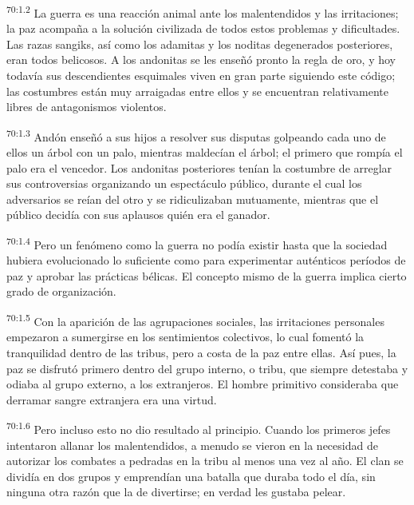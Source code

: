 \documentclass[twoside, 11pt]{book}
\begin{document}
\par
\textsuperscript{70:1.2} La guerra es una reacción animal ante los malentendidos y las irritaciones; la paz acompaña a la solución civilizada de todos estos problemas y dificultades. Las razas sangiks, así como los adamitas y los noditas degenerados posteriores, eran todos belicosos. A los andonitas se les enseñó pronto la regla de oro, y hoy todavía sus descendientes esquimales viven en gran parte siguiendo este código; las costumbres están muy arraigadas entre ellos y se encuentran relativamente libres de antagonismos violentos.

\par
\textsuperscript{70:1.3} Andón enseñó a sus hijos a resolver sus disputas golpeando cada uno de ellos un árbol con un palo, mientras maldecían el árbol; el primero que rompía el palo era el vencedor. Los andonitas posteriores tenían la costumbre de arreglar sus controversias organizando un espectáculo público, durante el cual los adversarios se reían del otro y se ridiculizaban mutuamente, mientras que el público decidía con sus aplausos quién era el ganador.

\par
\textsuperscript{70:1.4} Pero un fenómeno como la guerra no podía existir hasta que la sociedad hubiera evolucionado lo suficiente como para experimentar auténticos períodos de paz y aprobar las prácticas bélicas. El concepto mismo de la guerra implica cierto grado de organización.

\par
\textsuperscript{70:1.5} Con la aparición de las agrupaciones sociales, las irritaciones personales empezaron a sumergirse en los sentimientos colectivos, lo cual fomentó la tranquilidad dentro de las tribus, pero a costa de la paz entre ellas. Así pues, la paz se disfrutó primero dentro del grupo interno, o tribu, que siempre detestaba y odiaba al grupo externo, a los extranjeros. El hombre primitivo consideraba que derramar sangre extranjera era una virtud.

\par
\textsuperscript{70:1.6} Pero incluso esto no dio resultado al principio. Cuando los primeros jefes intentaron allanar los malentendidos, a menudo se vieron en la necesidad de autorizar los combates a pedradas en la tribu al menos una vez al año. El clan se dividía en dos grupos y emprendían una batalla que duraba todo el día, sin ninguna otra razón que la de divertirse; en verdad les gustaba pelear.
\end{document}
